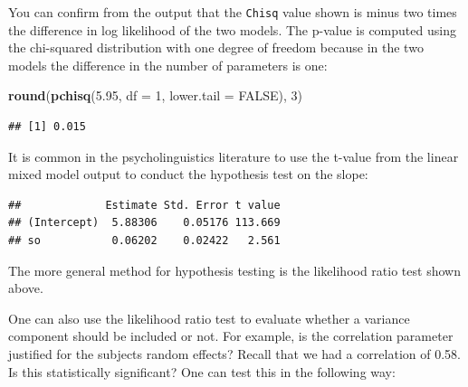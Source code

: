 \documentclass[12pt,]{krantz}
\newenvironment{Shaded}{\begin{snugshade}}{\end{snugshade}}
\newcommand{\DataTypeTok}[1]{\textcolor[rgb]{0.13,0.29,0.53}{#1}}
\newcommand{\DecValTok}[1]{\textcolor[rgb]{0.00,0.00,0.81}{#1}}
\newcommand{\FloatTok}[1]{\textcolor[rgb]{0.00,0.00,0.81}{#1}}
\newcommand{\KeywordTok}[1]{\textcolor[rgb]{0.13,0.29,0.53}{\textbf{#1}}}
\newcommand{\NormalTok}[1]{#1}
\newcommand{\OperatorTok}[1]{\textcolor[rgb]{0.81,0.36,0.00}{\textbf{#1}}}
\newcommand{\OtherTok}[1]{\textcolor[rgb]{0.56,0.35,0.01}{#1}}
\begin{document}
You can confirm from the output that the \texttt{Chisq} value shown is minus two times the difference in log likelihood of the two models. The p-value is computed using the chi-squared distribution with one degree of freedom because in the two models the difference in the number of parameters is one:

\begin{Shaded}
\begin{Highlighting}[]
\KeywordTok{round}\NormalTok{(}\KeywordTok{pchisq}\NormalTok{(}\FloatTok{5.95}\NormalTok{, }\DataTypeTok{df =} \DecValTok{1}\NormalTok{, }\DataTypeTok{lower.tail =} \OtherTok{FALSE}\NormalTok{), }\DecValTok{3}\NormalTok{)}
\end{Highlighting}
\end{Shaded}

\begin{verbatim}
## [1] 0.015
\end{verbatim}

It is common in the psycholinguistics literature to use the t-value from the linear mixed model output to conduct the hypothesis test on the slope:

\begin{Shaded}
\end{Shaded}

\begin{verbatim}
##             Estimate Std. Error t value
## (Intercept)  5.88306    0.05176 113.669
## so           0.06202    0.02422   2.561
\end{verbatim}

The more general method for hypothesis testing is the likelihood ratio test shown above.

One can also use the likelihood ratio test to evaluate whether a variance component should be included or not. For example, is the correlation parameter justified for the subjects random effects? Recall that we had a correlation of 0.58. Is this statistically significant? One can test this in the following way:
\end{document}
